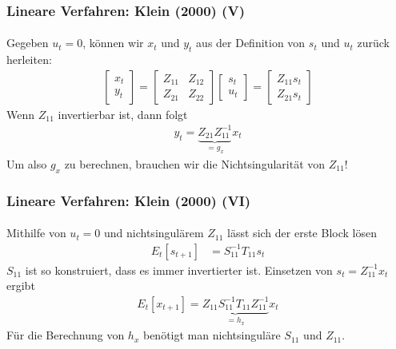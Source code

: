 \documentclass[10pt]{beamer}  %
\begin{document}
\begin{frame}
\frametitle{Lineare Verfahren: Klein (2000) (V)}\framesubtitle{}
Gegeben $u_t=0$, k\"{o}nnen wir $x_t$ und $y_t$ aus der Definition von $s_t$ und $u_t$ zur\"{u}ck herleiten:
\begin{align*}
  \begin{bmatrix} x_t \\ y_t \end{bmatrix} = \begin{bmatrix} Z_{11} & Z_{12}\\ Z_{21} & Z_{22} \end{bmatrix} \begin{bmatrix} s_t \\ u_t \end{bmatrix}
  =
  \begin{bmatrix}
    Z_{11} s_t\\
    Z_{21} s_t
  \end{bmatrix}
\end{align*}
Wenn $Z_{11}$ invertierbar ist, dann folgt
\begin{align*}
  y_t = \underbrace{Z_{21} Z_{11}^{-1}}_{=g_x} x_t
\end{align*}
Um also $g_x$ zu berechnen, brauchen wir die Nichtsingularit\"{a}t von $Z_{11}$!
\end{frame}

\begin{frame}
\frametitle{Lineare Verfahren: Klein (2000) (VI)}\framesubtitle{}
Mithilfe von $u_t=0$ und nichtsingul\"{a}rem $Z_{11}$ l\"{a}sst sich der erste Block l\"{o}sen
\begin{align*}
   E_t[s_{t+1}] &= S_{11}^{-1} T_{11} s_t
\end{align*}
$S_{11}$ ist so konstruiert, dass es immer invertierter ist. Einsetzen von $s_t = Z_{11}^{-1} x_t$ ergibt
\begin{align*}
   E_t[ x_{t+1}] = \underbrace{Z_{11} S_{11}^{-1} T_{11} Z_{11}^{-1}}_{=h_x} x_t
\end{align*}
F\"{u}r die Berechnung von $h_x$ ben\"{o}tigt man nichtsingul\"{a}re $S_{11}$ und $Z_{11}$.
\end{frame}
\end{document}
